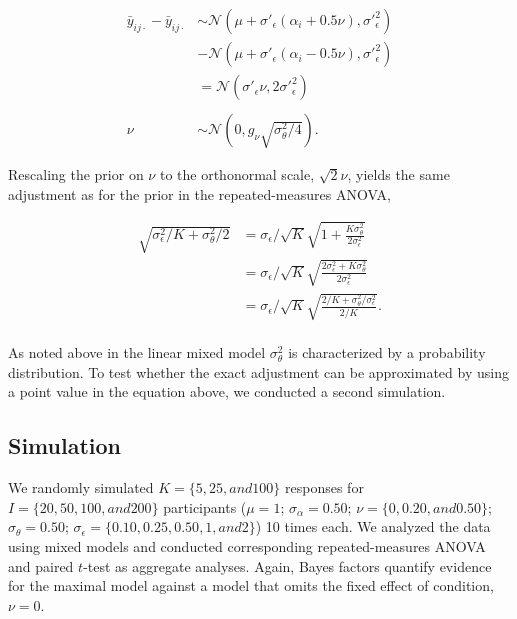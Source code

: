 \documentclass[
  man,floatsintext,draftall]{apa6}
\begin{document}
\[
\begin{aligned}
\bar{y}_{ij\cdot} - \bar{y}_{ij\cdot} & \sim \mathcal{N}(\mu + \sigma\prime_\epsilon (\alpha_i + 0.5 \nu), \sigma\prime_\epsilon^2) \\
& - \mathcal{N}(\mu + \sigma\prime_\epsilon (\alpha_i - 0.5 \nu), \sigma\prime_\epsilon^2) \\
  & = \mathcal{N}(\sigma\prime_\epsilon \nu, 2\sigma\prime_\epsilon^2) \\ & \\
  \nu & \sim \mathcal{N}(0, g_\nu \sqrt{\sigma_\theta^2/4}).
\end{aligned}
\]

Rescaling the prior on \(\nu\) to the orthonormal scale, \(\sqrt{2}\nu\), yields the same adjustment as for the prior in the repeated-measures ANOVA,

\[
\begin{aligned}
\sqrt{\sigma_\epsilon^2/K + \sigma_\theta^2/2} & = \sigma_\epsilon/\sqrt{K} \sqrt{1 + \frac{K\sigma^2_\theta}{2\sigma_\epsilon^2}} \\
  & = \sigma_\epsilon/\sqrt{K} \sqrt{\frac{2\sigma_\epsilon^2 + K\sigma^2_\theta}{2\sigma_\epsilon^2}} \\
  & = \sigma_\epsilon/\sqrt{K} \sqrt{\frac{2/K + \sigma^2_\theta/\sigma_\epsilon^2}{2/K}}. \\
\end{aligned}
\]

As noted above in the linear mixed model \(\sigma_\theta^2\) is characterized by a probability distribution.
To test whether the exact adjustment can be approximated by using a point value in the equation above, we conducted a second simulation.

\hypertarget{simulation-1}{%
\subsection{Simulation}\label{simulation-1}}

We randomly simulated \(K = \{5, 25, and 100\}\) responses for \(I = \{20, 50, 100, and 200\}\) participants (\(\mu = 1\); \(\sigma_\alpha = 0.50\); \(\nu = \{0, 0.20, and 0.50\}\); \(\sigma_\theta = 0.50\); \(\sigma_\epsilon = \{0.10, 0.25, 0.50, 1, and 2\}\)) 10 times each.
We analyzed the data using mixed models and conducted corresponding repeated-measures ANOVA and paired \(t\)-test as aggregate analyses.
Again, Bayes factors quantify evidence for the maximal model against a model that omits the fixed effect of condition, \(\nu = 0\).
\end{document}
